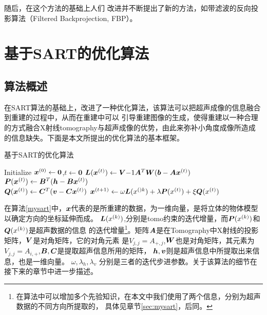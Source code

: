 随后，在这个方法的基础上人们
改进并不断提出了新的方法，如带滤波的反向投影算法（Filtered Backprojection, FBP）\cite{kak1979computerized}。

\chapter{基于SART的优化算法}
\section{算法概述}
在SART算法的基础上，改进了一种优化算法，该算法可以把超声成像的信息融合到重建的过程中，从而在重建中可以
引导重建图像的生成，使得重建以一种合理的方式融合X射线tomography与超声成像的优势，由此来弥补小角度成像所造成
的信息缺失。下面是本文所提出的优化算法的基本框架。
\begin{algo}\label{mysart}
基于SART的优化算法
\begin{algorithmic}[1]
\STATE
Initialize $\bm{ x}^{(0)} \leftarrow \bm{0}$,$t\leftarrow \bm{0}$
\REPEAT
\STATE
$\bm{L}(\bm{ x}^{(t)}) \leftarrow  \bm{ V}{-1}\bm{ A}^T\bm{ W}(\bm{b}-\bm{ A}\bm{ x}^{(t)})$ \\
$\bm{P}(\bm{ x}^{(t)}) \leftarrow \bm{ B}^{T}(\bm{ h}-\bm{ B}\bm{ x}^{(t)})$ \\    %
$\bm{Q}(\bm{ x}^{(t)}) \leftarrow \bm{C}^{T}(\bm{ v}-\bm{C}\bm{ x}^{(t)})$         %
\STATE
$\bm{ x}^{(t+1)}\leftarrow \omega\bm{L}(x^{()k}) + \lambda\bm{P}(x^{(t)}) + \xi\bm{Q}(x^{(t)})    $
\end{algorithmic}
\end{algo}

在算法\ref{mysart}中，$\bm{ x}$代表的是所重建的数据，为一维向量，是将立体的物体模型以确定方向的坐标延伸而成。
$\bm{L}(x^{(k)})$,分别是tomo约束的迭代增量，而$\bm{P}(x^{(k)})$和$ \bm{Q}(x^{(k)})$是超声数据的信息
的迭代增量\footnote{在算法中可以增加多个先验知识，在本文中我们使用了两个信息，分别为超声数据的不同方向所提取的，
具体见章节\ref{sec:mysart}，后同。}。矩阵$\bm{ A}$是在Tomography中X射线的投影矩阵，$\bm{ V}$是对角矩阵，它的对角元素
是$V_{j,j}=A_{+,j}$,$\bm{ W}$也是对角矩阵，其元素为$V_{j,j}=A_{i,+}$,$\bm{ B},\bm{C}$是提取超声信息所用的矩阵，
$\bm{ h},\bm{ v}$则是超声信息中所提取出来信息，也是一维向量。
$\omega,\lambda_h,\lambda_v$
分别是三者的迭代步进参数。关于该算法的细节在接下来的章节中进一步描述。
